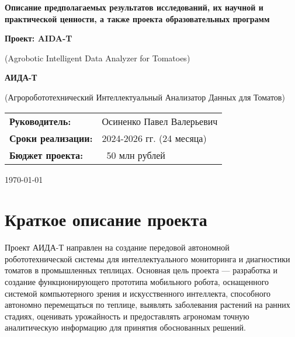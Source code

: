 \documentclass[12pt,a4paper]{article}
\begin{document}
\begin{titlepage}
    \centering
    \vspace*{2cm}
    
    {\Huge\bfseries Описание предполагаемых результатов исследований, их научной и практической ценности, а также проекта образовательных программ\par}
    
    \vspace{2cm}
    
    {\Large\bfseries Проект: AIDA-T\par}
    {\large (Agrobotic Intelligent Data Analyzer for Tomatoes)\par}
    
    \vspace{1cm}
    
    {\large\bfseries АИДА-Т\par}
    {\large (Агроробототехнический Интеллектуальный Анализатор Данных для Томатов)\par}
    
    \vspace{2cm}
    
    \begin{tabular}{ll}
        \textbf{Руководитель:} & Осиненко Павел Валерьевич \\
        \textbf{Сроки реализации:} & 2024-2026 гг. (24 месяца) \\
        \textbf{Бюджет проекта:} & ~50 млн рублей
    \end{tabular}
    
    \vfill
    
    {\large \today\par}
\end{titlepage}

\tableofcontents
\newpage

\section{Краткое описание проекта}

Проект АИДА-Т направлен на создание передовой автономной робототехнической системы для интеллектуального мониторинга и диагностики томатов в промышленных теплицах. Основная цель проекта — разработка и создание функционирующего прототипа мобильного робота, оснащенного системой компьютерного зрения и искусственного интеллекта, способного автономно перемещаться по теплице, выявлять заболевания растений на ранних стадиях, оценивать урожайность и предоставлять агрономам точную аналитическую информацию для принятия обоснованных решений.
\end{document}
